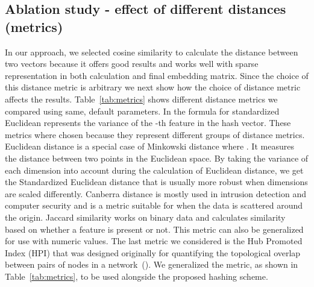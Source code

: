 \documentclass[twoside,11pt]{article}
\begin{document}
\subsection{Ablation study - effect of different distances (metrics)}
\label{sec:distances}
In our approach, we selected cosine similarity to calculate the distance between two vectors because it offers good results and works well with sparse representation in both calculation and final embedding matrix. Since the choice of this distance metric is arbitrary we next show how the choice of distance metric affects the results. Table~\ref{tab:metrics} shows different distance metrics we compared using same, default parameters. In the formula for standardized Euclidean  represents the variance of the -th feature in the hash vector. These metrics where chosen because they represent different groups of distance metrics. Euclidean distance is a special case of Minkowski distance where . It measures the distance between two points in the Euclidean space. By taking the variance of each dimension into account during the calculation of Euclidean distance, we get the Standardized Euclidean distance that is usually more robust when dimensions are scaled differently. Canberra distance is mostly used in intrusion detection and computer security and is a metric suitable for when the data is scattered around the origin. Jaccard similarity works on binary data and calculates similarity based on whether a feature is present or not. This metric can also be generalized for use with numeric values. The last metric we considered is the Hub Promoted Index (HPI) that was designed originally for quantifying the topological overlap between pairs of nodes in a network~(\cite{zhou2009hpi}). We generalized the metric, as shown in Table~\ref{tab:metrics}, to be used alongside the proposed hashing scheme.

\renewcommand{\arraystretch}{1.5}
\begin{table}
\centering
\caption{Used distance metrics and their formulas.}
\label{tab:metrics}
\setlength{\tabcolsep}{3pt}
\end{table}
\renewcommand{\arraystretch}{1}
\end{document}
